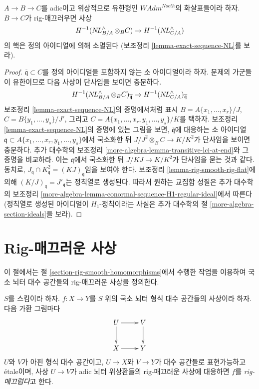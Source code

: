 \begin{lemma}
\label{lemma-exact-sequence-NL-rig-smooth}
$A \to B \to C$를 adic이고 위상적으로 유한형인
$\textit{WAdm}^{Noeth}$의 화살표들이라 하자. $B \to C$가
rig-매끄러우면 사상
$$
H^{-1}(\mathop{N\!L}\nolimits_{B/A}^\wedge \otimes_B C) \to H^{-1}(\mathop{N\!L}\nolimits_{C/A}^\wedge)
$$
의 핵은 정의 아이디얼에 의해 소멸된다
(보조정리 \ref{lemma-exact-sequence-NL}를 보라).
\end{lemma}

\begin{proof}
$\overline{\mathfrak q} \subset C$를 정의 아이디얼을 포함하지 않는
소 아이디얼이라 하자. 문제의 가군들이 유한이므로 다음 사상이 단사임을
보이면 충분하다.
$$
H^{-1}(\mathop{N\!L}\nolimits_{B/A}^\wedge \otimes_B C)_{\overline{\mathfrak q}} \to
H^{-1}(\mathop{N\!L}\nolimits_{C/A}^\wedge)_{\overline{\mathfrak q}}
$$
보조정리 \ref{lemma-exact-sequence-NL}의 증명에서처럼 표시
$B = A\{x_1, \ldots, x_r\}\allowbreak/J$,
$C = B\{y_1, \ldots, y_s\}\allowbreak/J'$, 그리고
$C = A\{x_1, \ldots, x_r, y_1, \ldots, y_s\}\allowbreak/K$를 택하자.
보조정리 \ref{lemma-exact-sequence-NL}의 증명에 있는 그림을 보면,
$\overline{\mathfrak q}$에 대응하는 소 아이디얼
$\mathfrak q \subset A\{x_1, \ldots, x_r,
y_1, \ldots, y_s\}$에서
국소화한 뒤 $J/J^2 \otimes_B C \to K/K^2$가 단사임을 보이면 충분하다.
추가 대수학의 보조정리
\ref{more-algebra-lemma-transitive-lci-at-end}와 그 증명을 비교하라.
이는 $\mathfrak q$에서 국소화한 뒤 $J/KJ \to K/K^2$가 단사임을
묻는 것과 같다. 동치로,
$J_\mathfrak q \cap K^2_\mathfrak q = (KJ)_\mathfrak q$임을 보여야 한다.
보조정리 \ref{lemma-rig-smooth-rig-flat}에 의해
$(K/J)_\mathfrak q = J'_\mathfrak q$는 정칙열로 생성된다.
따라서 원하는 교집합 성질은 추가 대수학의 보조정리
\ref{more-algebra-lemma-conormal-sequence-H1-regular-ideal}에서 따른다
(정칙열로 생성된 아이디얼이 $H_1$-정칙이라는 사실은 추가 대수학의 절
\ref{more-algebra-section-ideals}을 보라).
\end{proof}

\section{Rig-매끄러운 사상}
\label{section-rig-smooth-morphisms}

\noindent
이 절에서는 절 \ref{section-rig-smooth-homomorphisms}에서 수행한 작업을 이용하여
국소 뇌터 대수 공간들의 rig-매끄러운 사상을 정의한다.

\begin{definition}
\label{definition-rig-smooth}
$S$를 스킴이라 하자. $f : X \to Y$를 $S$ 위의 국소 뇌터
형식 대수 공간들의 사상이라 하자. 다음 가환 그림마다
$$
\xymatrix{
U \ar[d] \ar[r] & V \ar[d] \\
X \ar[r] & Y
}
$$
$U$와 $V$가 아핀 형식 대수 공간이고, $U \to X$와 $V \to Y$가
대수 공간들로 표현가능하고 \'etale이며, 사상 $U \to V$가
adic 뇌터 위상환들의 rig-매끄러운 사상에 대응하면 $f$를
{\it rig-매끄럽다}고 한다.
\end{definition}


